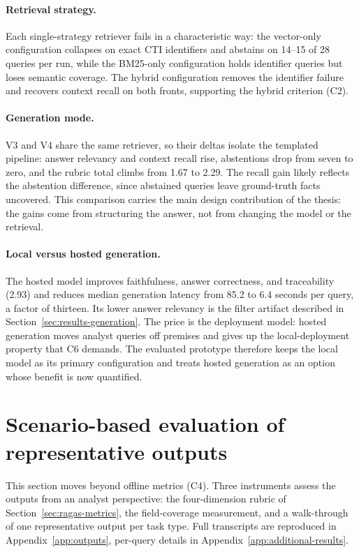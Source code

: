 \paragraph{Retrieval strategy.} Each single-strategy retriever fails in
a characteristic way: the vector-only configuration collapses on exact
CTI identifiers and abstains on 14--15 of 28 queries per run, while the
BM25-only configuration holds identifier queries but loses semantic
coverage. The hybrid configuration removes the identifier failure and
recovers context recall on both fronts, supporting the hybrid
criterion (C2).

\paragraph{Generation mode.} V3 and V4 share the same retriever, so
their deltas isolate the templated pipeline: answer relevancy and
context recall rise, abstentions drop from seven to zero, and the
rubric total climbs from 1.67 to 2.29. The recall gain likely reflects
the abstention difference, since abstained queries leave ground-truth
facts uncovered. This comparison carries the main design contribution
of the thesis: the gains come from structuring the answer, not from
changing the model or the retrieval.

\paragraph{Local versus hosted generation.} The hosted model improves
faithfulness, answer correctness, and traceability (2.93) and reduces
median generation latency from 85.2 to 6.4 seconds per query, a factor
of thirteen. Its lower answer relevancy is the filter artifact
described in Section~\ref{sec:results-generation}. The price is the
deployment model: hosted generation moves analyst queries off premises
and gives up the local-deployment property that C6 demands. The
evaluated prototype therefore keeps the local model as its primary
configuration and treats hosted generation as an option whose benefit
is now quantified.

\section{Scenario-based evaluation of representative outputs}
\label{sec:representative-outputs}

This section moves beyond offline metrics (C4). Three instruments assess
the outputs from an analyst perspective: the four-dimension rubric of
Section~\ref{sec:ragas-metrics}, the field-coverage measurement, and a
walk-through of one representative output per task type. Full transcripts
are reproduced in Appendix~\ref{app:outputs}, per-query details in
Appendix~\ref{app:additional-results}.


